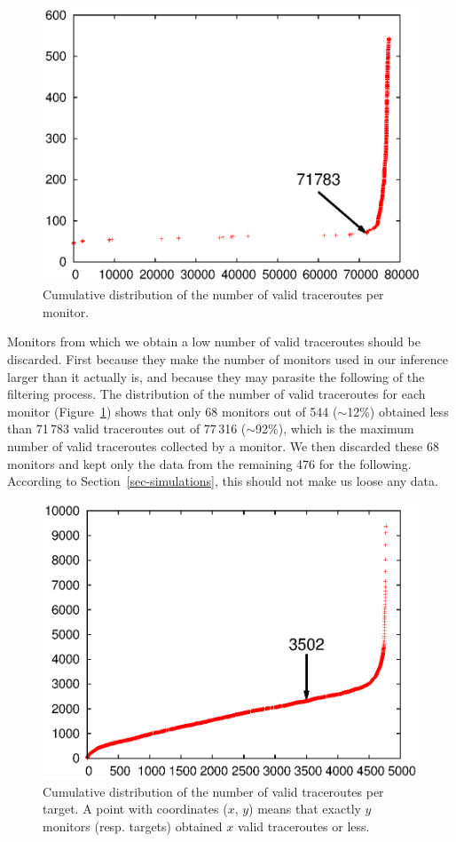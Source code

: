 \documentclass[conference]{IEEEtran}
\begin{document}
\begin{figure}[!ht]
\centering
\includegraphics[scale=.5]{sources.valid.eps}
\caption{
Cumulative distribution of the number of valid traceroutes per monitor.
}
\label{fig-valid-monitor}
\end{figure}

Monitors from which we obtain a low number of valid traceroutes should be discarded. First because they make the number of monitors used in our inference larger than it actually is, and because they may parasite the following of the filtering process. The distribution of the number of valid traceroutes for each monitor (Figure~\ref{fig-valid-monitor}) shows that only 68 monitors out of 544 ($\sim$12\%) obtained less than 71\,783 valid traceroutes out of 77\,316 ($\sim$92\%), which is the maximum number of valid traceroutes collected by a monitor. We then discarded these 68 monitors and kept only the data from the remaining 476 for the following. According to Section~\ref{sec-simulations}, this should not make us loose any data.


\begin{figure}[!ht]
\centering
\includegraphics[scale=.5]{targets.valid.eps}
\caption{
Cumulative distribution of the number of valid traceroutes per target. A point with coordinates ($x$, $y$) means that exactly $y$ monitors (resp. targets) obtained $x$ valid traceroutes or less.
}
\label{fig-valid-target}
\end{figure}
\end{document}
